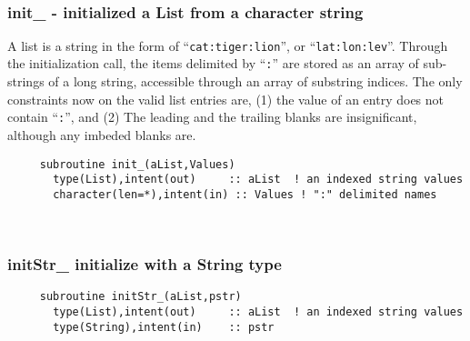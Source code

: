  
\mbox{}\hrulefill\ 
 
  \subsubsection{init\_ - initialized a List from a character string}

  	A list is a string in the form of ``\verb"cat:tiger:lion"'',
     or ``\verb"lat:lon:lev"''.  Through the initialization call, the
     items delimited by ``\verb":"'' are stored as an array of sub-
     strings of a long string, accessible through an array of substring
     indices.  The only constraints now on the valid list entries are,
     (1) the value of an entry does not contain ``\verb":"'', and (2)
     The leading and the trailing blanks are insignificant, although
     any imbeded blanks are.
  
\begin{verbatim} 
     subroutine init_(aList,Values)
       type(List),intent(out)	  :: aList  ! an indexed string values
       character(len=*),intent(in) :: Values ! ":" delimited names
 \end{verbatim} %
 
 
\mbox{}\hrulefill\ 
 
  \subsubsection{initStr\_ initialize with a String type}

\begin{verbatim} 
     subroutine initStr_(aList,pstr)
       type(List),intent(out)     :: aList  ! an indexed string values
       type(String),intent(in)	  :: pstr
 \end{verbatim} %
 
 
